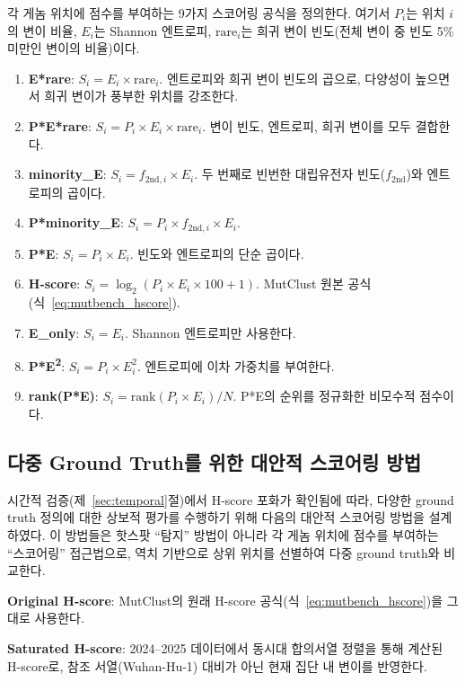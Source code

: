 각 게놈 위치에 점수를 부여하는 9가지 스코어링 공식을 정의한다.
여기서 $P_i$는 위치 $i$의 변이 비율, $E_i$는 Shannon 엔트로피, $\text{rare}_i$는 희귀 변이 빈도(전체 변이 중 빈도 5\% 미만인 변이의 비율)이다.

\begin{enumerate}
\item \textbf{E*rare}: $S_i = E_i \times \text{rare}_i$. 엔트로피와 희귀 변이 빈도의 곱으로, 다양성이 높으면서 희귀 변이가 풍부한 위치를 강조한다.
\item \textbf{P*E*rare}: $S_i = P_i \times E_i \times \text{rare}_i$. 변이 빈도, 엔트로피, 희귀 변이를 모두 결합한다.
\item \textbf{minority\_E}: $S_i = f_{2\text{nd},i} \times E_i$. 두 번째로 빈번한 대립유전자 빈도($f_{2\text{nd}}$)와 엔트로피의 곱이다.
\item \textbf{P*minority\_E}: $S_i = P_i \times f_{2\text{nd},i} \times E_i$.
\item \textbf{P*E}: $S_i = P_i \times E_i$. 빈도와 엔트로피의 단순 곱이다.
\item \textbf{H-score}: $S_i = \log_2(P_i \times E_i \times 100 + 1)$. MutClust 원본 공식(식~\ref{eq:mutbench_hscore}).
\item \textbf{E\_only}: $S_i = E_i$. Shannon 엔트로피만 사용한다.
\item \textbf{P*E\textsuperscript{2}}: $S_i = P_i \times E_i^2$. 엔트로피에 이차 가중치를 부여한다.
\item \textbf{rank(P*E)}: $S_i = \text{rank}(P_i \times E_i) / N$. P*E의 순위를 정규화한 비모수적 점수이다.
\end{enumerate}

\subsection{다중 Ground Truth를 위한 대안적 스코어링 방법}
\label{subsec:alternative_scoring}

시간적 검증(제~\ref{sec:temporal}절)에서 H-score 포화가 확인됨에 따라, 다양한 ground truth 정의에 대한 상보적 평가를 수행하기 위해 다음의 대안적 스코어링 방법을 설계하였다.
이 방법들은 핫스팟 ``탐지'' 방법이 아니라 각 게놈 위치에 점수를 부여하는 ``스코어링'' 접근법으로, 역치 기반으로 상위 위치를 선별하여 다중 ground truth와 비교한다.

\textbf{Original H-score}: MutClust의 원래 H-score 공식(식~\ref{eq:mutbench_hscore})을 그대로 사용한다.

\textbf{Saturated H-score}: 2024--2025 데이터에서 동시대 합의서열 정렬을 통해 계산된 H-score로, 참조 서열(Wuhan-Hu-1) 대비가 아닌 현재 집단 내 변이를 반영한다.

